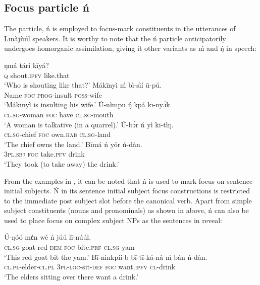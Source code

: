 \documentclass[output=paper,colorlinks,citecolor=brown]{langscibook}
\begin{document}
\subsection{Focus particle ń }\label{sec:bisilki:5.1}

The particle, ń is employed to focus-mark constituents in the utterances of Līnàjùúl speakers. It is worthy to note that the ń particle anticipatorily undergoes homorganic assimilation, giving it other variants as ḿ and ŋ́  in speech:

\ea%
    \label{ex:bisilki:8}
    \ea\label{ex:bisilki:8a}
        \ea\label{ex:bisilki:8ai}
        \gll    ŋmá	tárí		kīyá?\\
                \textsc{q}	shout\textsc{.ipfv}	like.that\\
        \glt    ‘Who is shouting like that?’
        \ex\label{ex:bisilki:8aii}
        \gll    Mákīnyì	ḿ	bì-sìí		ū-pú.\\
                Name		\textsc{foc}	\textsc{prog-}insult	\textsc{poss-}wife\\
        \glt    ‘Mákīnyì is insulting his wife.’
        \z
    \ex\label{ex:bisilki:8b}
    \gll    Ú-nìmpū		ŋ́	kpá	kī-nyɔ́k.\\
            \textsc{cl.sg-}woman	\textsc{foc}	have	\textsc{cl.sg-}mouth\\
    \glt    ‘A woman is talkative (in a quarrel).’
    \ex\label{ex:bisilki:8c}
    \gll    Ú-bɔ́r		ń	yì		kī-tìŋ.\\
            \textsc{cl.sg-}chief	\textsc{foc}	own\textsc{.hab}	\textsc{cl.sg-}land\\
    \glt    ‘The chief owns the land.’
    \ex\label{ex:bisilki:8d}
    \gll    Bīmá		ń	yór		ń-dàn.\\
            \textsc{3pl.sbj}	\textsc{foc}	take\textsc{.pfv}	drink\\
    \glt    ‘They took (to take away) the drink.’
    \z
\z

From the examples in , it can be noted that ń is used to mark focus on sentence initial subjects. Ń in its sentence initial subject focus constructions is restricted to the immediate post subject slot before the canonical verb. Apart from simple subject constituents (nouns and pronominals) as shown in  above, ń can also be used to place focus on complex subject NPs as the sentences in  reveal:

\ea%
    \label{ex:bisilki:9}
    \ea\label{ex:bisilki:9a}
    \gll    Ú-ŋóó	mέn		wé	ń	júú		lī-núúl.\\
            \textsc{cl.sg-}goat	red	\textsc{dem}	\textsc{foc}	bite\textsc{.prf}	\textsc{cl.sg-}yam\\
    \glt    ‘This red goat bit the yam.’
    \ex\label{ex:bisilki:9b}
    \gll    Bī-nìnkpíí-b	         bī-tī-ká-nà	    ḿ           bán	 ń-dàn.\\
            \textsc{cl.pl-}elder\textsc{-cl.pl}   \textsc{3pl-loc-}sit\textsc{-def}	   \textsc{foc}	      want\textsc{.ipfv}	 \textsc{cl-}drink\\
    \glt    ‘The elders sitting over there want a drink.’
    \z
\z
\end{document}
